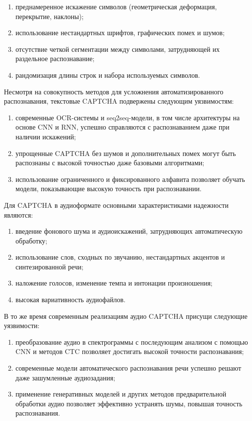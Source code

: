 \begin{enumerate}
    \item преднамеренное искажение символов (геометрическая деформация, 
    перекрытие, наклоны);
    \item использование нестандартных шрифтов, графических помех и шумов;
    \item отсутствие четкой сегментации между символами, затрудняющей их 
    раздельное распознавание;
    \item рандомизация длины строк и набора используемых символов.
\end{enumerate}

Несмотря на совокупность методов для усложнения автоматизированного 
распознавания, текстовые CAPTCHA подвержены следующим уязвимостям:

\begin{enumerate}
    \item современные OCR-системы и seq2seq-модели, в том числе архитектуры на 
    основе CNN и RNN, успешно справляются с распознаванием даже при наличии 
    искажений;
    \item упрощенные CAPTCHA без шумов и дополнительных помех могут быть 
    распознаны с высокой точностью даже базовыми алгоритмами;
    \item использование ограниченного и фиксированного алфавита позволяет обучать 
    модели, показывающие высокую точность при распознавании.
\end{enumerate}

Для CAPTCHA в аудиоформате основными характеристиками надежности являются:

\begin{enumerate}
    \item введение фонового шума и аудиоискажений, затрудняющих автоматическую 
    обработку;
    \item использование слов, сходных по звучанию, нестандартных акцентов и 
    синтезированной речи;
    \item наложение голосов, изменение темпа и интонации произношения;
    \item высокая вариативность аудиофайлов.
\end{enumerate}

В то же время современным реализациям аудио CAPTCHA присущи следующие уязвимости:

\begin{enumerate}
    \item преобразование аудио в спектрограммы с последующим анализом с помощью 
    CNN и методов CTC позволяет достигать высокой точности распознавания;
    \item современные модели автоматического распознавания речи успешно решают 
    даже зашумленные аудиозадания;
    \item применение генеративных моделей и других методов предварительной 
    обработки аудио позволяет эффективно устранять шумы, повышая точность 
    распознавания.
\end{enumerate}


